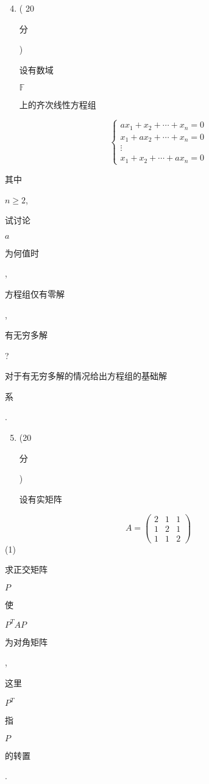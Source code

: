 \documentclass[10pt]{article}
\begin{document}
\begin{enumerate}
  \setcounter{enumi}{3}
  \item ( 20 \begin{CJK}{UTF8}{mj}分\end{CJK}) \begin{CJK}{UTF8}{mj}设有数域\end{CJK} $\mathbb{F}$ \begin{CJK}{UTF8}{mj}上的齐次线性方程组\end{CJK}
\end{enumerate}
$$
\left\{\begin{array}{c}
a x_{1}+x_{2}+\cdots+x_{n}=0 \\
x_{1}+a x_{2}+\cdots+x_{n}=0 \\
\vdots \\
x_{1}+x_{2}+\cdots+a x_{n}=0
\end{array}\right.
$$
\begin{CJK}{UTF8}{mj}其中\end{CJK} $n \geq 2$, \begin{CJK}{UTF8}{mj}试讨论\end{CJK} $a$ \begin{CJK}{UTF8}{mj}为何值时\end{CJK}, \begin{CJK}{UTF8}{mj}方程组仅有零解\end{CJK}, \begin{CJK}{UTF8}{mj}有无穷多解\end{CJK}? \begin{CJK}{UTF8}{mj}对于有无穷多解的情况给出方程组的基础解\end{CJK} \begin{CJK}{UTF8}{mj}系\end{CJK}.

\begin{enumerate}
  \setcounter{enumi}{4}
  \item (20 \begin{CJK}{UTF8}{mj}分\end{CJK}) \begin{CJK}{UTF8}{mj}设有实矩阵\end{CJK}
\end{enumerate}
$$
A=\left(\begin{array}{lll}
2 & 1 & 1 \\
1 & 2 & 1 \\
1 & 1 & 2
\end{array}\right)
$$
(1) \begin{CJK}{UTF8}{mj}求正交矩阵\end{CJK} $P$ \begin{CJK}{UTF8}{mj}使\end{CJK} $P^{T} A P$ \begin{CJK}{UTF8}{mj}为对角矩阵\end{CJK}, \begin{CJK}{UTF8}{mj}这里\end{CJK} $P^{T}$ \begin{CJK}{UTF8}{mj}指\end{CJK} $P$ \begin{CJK}{UTF8}{mj}的转置\end{CJK}.
\end{document}
